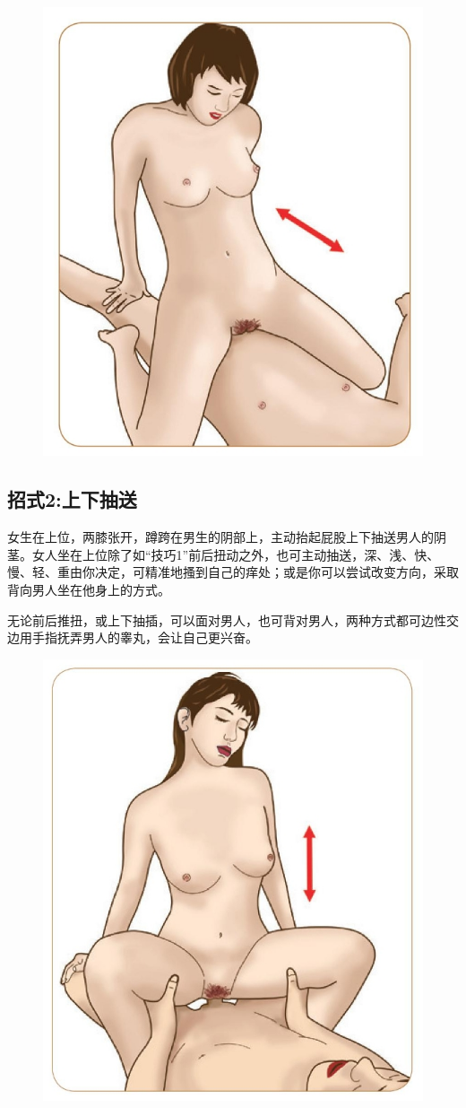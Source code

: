 \documentclass[12pt,UTF8]{ctexbook}
\begin{document}
\begin{figure}[htbp]
	\centering
	\includegraphics[width=0.7\linewidth]{24}
	\caption{}
	\label{fig:1}
\end{figure}

\subsection{招式2:上下抽送}

女生在上位，两膝张开，蹲跨在男生的阴部上，主动抬起屁股上下抽送男人的阴茎。女人坐在上位除了如“技巧1”前后扭动之外，也可主动抽送，深、浅、快、慢、轻、重由你决定，可精准地搔到自己的痒处；或是你可以尝试改变方向，采取背向男人坐在他身上的方式。

无论前后推扭，或上下抽插，可以面对男人，也可背对男人，两种方式都可边性交边用手指抚弄男人的睾丸，会让自己更兴奋。

\begin{figure}[htbp]
	\centering
	\includegraphics[width=0.7\linewidth]{25}
	\caption{}
	\label{fig:1}
\end{figure}
\end{document}
